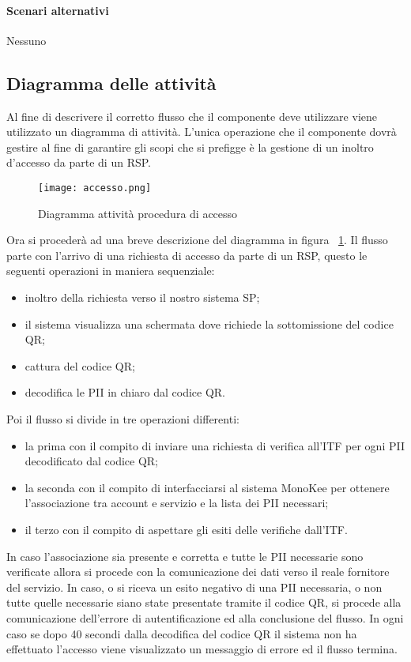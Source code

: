 \paragraph{Scenari alternativi}  Nessuno


\subsection{Diagramma delle attività}
Al fine di descrivere il corretto flusso che il componente deve utilizzare viene utilizzato un diagramma di attività. L’unica operazione che il componente dovrà gestire al fine di garantire gli scopi che si prefigge è la gestione di un inoltro d'accesso da parte di un RSP. 
\begin{figure}[!h]
    \centering
    \texttt{[image: accesso.png]} 
    \caption{Diagramma attività procedura di accesso}
    \label{fig:act-login} 
\end{figure}

Ora si procederà ad una breve descrizione del diagramma in figura ~\ref{fig:act-login}. 
Il flusso parte con l’arrivo di una richiesta di accesso da parte di un RSP, questo le seguenti operazioni in maniera sequenziale: 
\begin{itemize}
    \item inoltro della richiesta verso il nostro sistema SP;
    \item il sistema visualizza una schermata dove richiede la sottomissione del codice QR;
    \item cattura del codice QR;
    \item decodifica le PII in chiaro dal codice QR.
\end{itemize}


Poi il flusso si divide in tre operazioni differenti:
\begin{itemize}
    \item la prima con il compito di inviare una richiesta di verifica all’ITF per ogni PII decodificato dal codice QR;
    \item la seconda con il compito di interfacciarsi al sistema MonoKee per ottenere l’associazione tra account e servizio e la lista dei PII necessari;
    \item il terzo con il compito di aspettare gli esiti delle verifiche dall’ITF.
\end{itemize}
In caso l’associazione sia presente e corretta e tutte le PII necessarie sono verificate allora si procede con la comunicazione dei dati verso il reale fornitore del servizio.
In caso, o si riceva un esito negativo di una PII necessaria, o non tutte quelle necessarie siano state presentate tramite il codice QR, si procede alla comunicazione dell’errore di autentificazione ed alla conclusione del flusso.
In ogni caso se dopo 40 secondi dalla decodifica del codice QR il sistema non ha effettuato l’accesso viene visualizzato un messaggio di errore ed il flusso termina.

